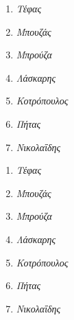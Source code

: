 \documentclass[a4paper,11pt]{article}
\begin{document}
	\begin{enumerate}  
	\item \textit{Τέφας}
	\item \textit{Μπουζάς}
	\item \textit{Μπρούζα}
	\item \textit{Λάσκαρης}
	\item \textit{Κοτρόπουλος}
	\item \textit{Πήτας}
	\item \textit{Νικολαΐδης}	
	\end{enumerate}	
	
	\begin{enumerate}[label=\textbf(\greek*)]
	\item \textit{Τέφας}
	\item \textit{Μπουζάς}
	\item \textit{Μπρούζα}
	\item \textit{Λάσκαρης}
	\item \textit{Κοτρόπουλος}
	\item \textit{Πήτας}
	\item \textit{Νικολαΐδης}	
	\end{enumerate}	


\end{document}
